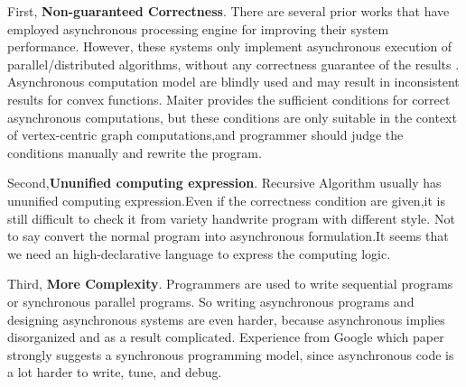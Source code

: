 First, \textbf{Non-guaranteed Correctness}. There are several prior works that have employed asynchronous processing engine for improving their system performance. However, these systems only implement asynchronous execution of parallel/distributed algorithms, without any correctness guarantee of the results \cite{Low:2012:DGF:2212351.2212354}. Asynchronous computation model are blindly used and may result in inconsistent results for convex functions. Maiter \cite{maiter} provides the sufficient conditions for correct asynchronous computations, but these conditions are only suitable in the context of vertex-centric graph computations,and programmer should judge the conditions manually and rewrite the program.

Second,\textbf{Ununified computing expression}.
Recursive Algorithm usually has ununified computing expression.Even if the correctness condition are given,it is still difficult to check it from variety handwrite program with different style. Not to say convert the normal program into asynchronous formulation.It seems that we need an high-declarative language to express the computing logic.

Third, \textbf{More Complexity}. Programmers are used to write sequential programs or synchronous parallel programs. So writing asynchronous programs and designing asynchronous systems are even harder, because asynchronous implies disorganized and as a result complicated. Experience from Google \cite{}{\color{red}which paper} strongly suggests a synchronous programming model, since asynchronous code is a lot harder to write, tune, and debug.


